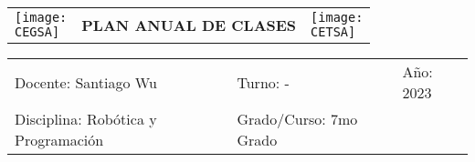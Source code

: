 \documentclass[landscape, a4paper, 10pt]{article}
\newcommand{\profesor}{Santiago Wu}
\newcommand{\discipline}{Robótica y Programación}
\newcommand{\currentyear}{2023}
\newcommand{\CEGSA}{cegsa-logo.png}
\newcommand{\CETSA}{cetsa-logo.png}
\begin{document}
	\pagebreak[4]
	\begin{tabularx}{\textwidth}{ >{\raggedright\arraybackslash}X >{\centering\arraybackslash}X >{\raggedleft\arraybackslash}X }
		\texttt{[image: \\CEGSA]} &
		\textbf{PLAN ANUAL DE CLASES} &
		\texttt{[image: \\CETSA]}
	\end{tabularx}
	\begin{tabularx}{\textwidth}{ >{\raggedright\arraybackslash}X >{\raggedright\arraybackslash}X >{\raggedright\arraybackslash}X }
		Docente: \profesor &
		Turno: - &
		Año: \currentyear \\
		Disciplina: \discipline &
		Grado/Curso: 7mo Grado &
		 \\
	\end{tabularx}
	\centering
\end{document}
